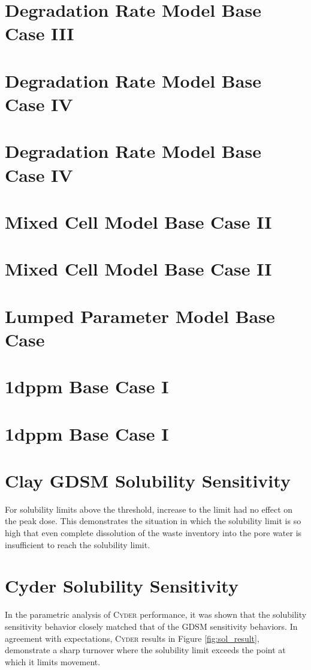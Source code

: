 \documentclass[letterpaper]{article}
\newcommand{\Cyder}{\textsc{Cyder}\xspace}
\begin{document}
\section*{Degradation Rate Model Base Case III}
\section*{Degradation Rate Model Base Case IV}
\section*{Degradation Rate Model Base Case IV}
\section*{Mixed Cell Model Base Case  II}
\section*{Mixed Cell Model Base Case  II}
\section*{Lumped Parameter Model Base Case}
\section*{1dppm Base Case I}
\section*{1dppm Base Case I}
\section*{Clay GDSM Solubility Sensitivity}
For solubility limits above the threshold, increase to the limit had no effect on the peak dose. This demonstrates the 
situation in which the solubility limit is so high that even complete 
dissolution of the waste inventory into the pore water is insufficient to reach 
the solubility limit.
\section*{Cyder Solubility Sensitivity}
In the parametric analysis of \Cyder performance, it was shown that the 
solubility sensitivity behavior closely matched that of the GDSM 
sensitivity behaviors. In agreement with expectations, \Cyder results in Figure 
\ref{fig:sol_result}, demonstrate a sharp turnover 
where the solubility limit exceeds the point at which it limits movement. 
\end{document}
